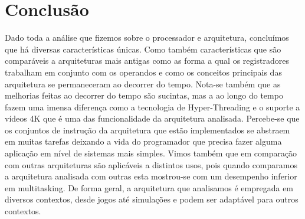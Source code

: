 \documentclass[12pt,a4paper,brazilian,utf8]{ppgsi}
\begin{document}
\section{Conclusão}
    Dado toda a análise que fizemos sobre o processador e arquitetura, concluímos que há diversas características únicas. Como também características que são comparáveis a arquiteturas mais antigas como as forma a qual os registradores trabalham em conjunto com os operandos e como os conceitos principais das arquitetura se permaneceram ao decorrer do tempo. Nota-se também que as melhorias feitas ao decorrer do tempo são sucintas, mas a ao longo do tempo fazem uma imensa diferença como a tecnologia de Hyper-Threading e o suporte a vídeos 4K que é uma das funcionalidade da arquitetura analisada. Percebe-se que os conjuntos de instrução da arquitetura que estão implementados se abstraem em muitas tarefas deixando a vida do programador que precisa fazer alguma aplicação em nível de sistemas mais simples. Vimos também que em comparação com outras arquiteturas são aplicáveis a distintos usos, pois quando comparamos a arquitetura analisada com outras esta mostrou-se com um desempenho inferior em multitasking. De forma geral, a arquitetura que analisamos é empregada em diversos contextos, desde jogos até simulações e podem ser adaptável para outros contextos. 



\end{document}
